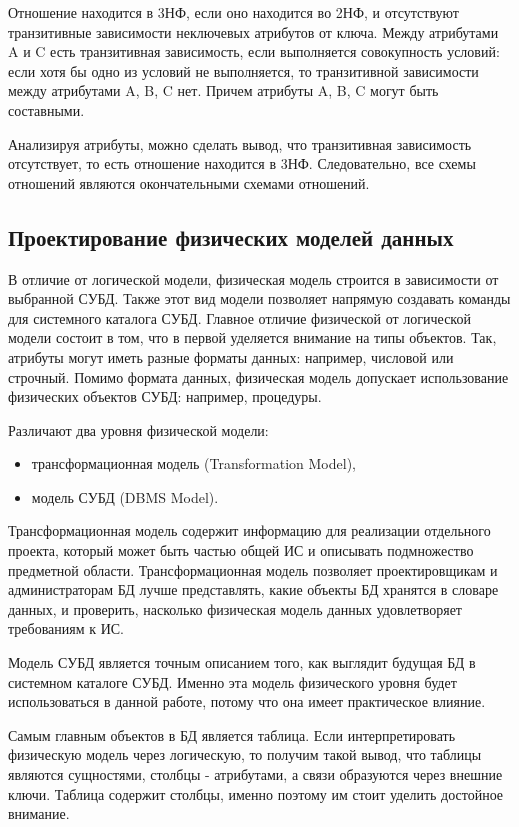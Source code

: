 Отношение находится в 3НФ, если оно находится во 2НФ, и отсутствуют транзитивные зависимости неключевых атрибутов от ключа. Между атрибутами A и C есть транзитивная зависимость, если выполняется совокупность условий: если хотя бы одно из условий не выполняется, то транзитивной зависимости между атрибутами A, B, C нет. Причем атрибуты A, B, C могут быть составными.

Анализируя атрибуты, можно сделать вывод, что транзитивная зависимость отсутствует, то есть отношение находится в 3НФ. Следовательно, все схемы отношений являются окончательными схемами отношений.

\subsection{Проектирование физических моделей данных}

В отличие от логической модели, физическая модель строится в зависимости от выбранной СУБД. Также этот вид модели позволяет напрямую создавать команды для системного каталога СУБД. Главное отличие физической от логической модели состоит в том, что в первой уделяется внимание на типы объектов. Так, атрибуты могут иметь разные форматы данных: например, числовой или строчный. Помимо формата данных, физическая модель допускает использование физических объектов СУБД: например, процедуры.

Различают два уровня физической модели:

\begin{itemize}
    \item трансформационная модель (Transformation Model),
    \item модель СУБД (DBMS Model).
\end{itemize}

Трансформационная модель содержит информацию для реализации отдельного проекта, который может быть частью общей ИС и описывать подмножество предметной области. Трансформационная модель позволяет проектировщикам и администраторам БД лучше представлять, какие объекты БД хранятся в словаре данных, и проверить, насколько физическая модель данных удовлетворяет требованиям к ИС.

Модель СУБД является точным описанием того, как выглядит будущая БД в системном каталоге СУБД. Именно эта модель физического уровня будет использоваться в данной работе, потому что она имеет практическое влияние.

Самым главным объектов в БД является таблица. Если интерпретировать физическую модель через логическую, то получим такой вывод, что таблицы являются сущностями, столбцы - атрибутами, а связи образуются через внешние ключи. Таблица содержит столбцы, именно поэтому им стоит уделить достойное внимание.

